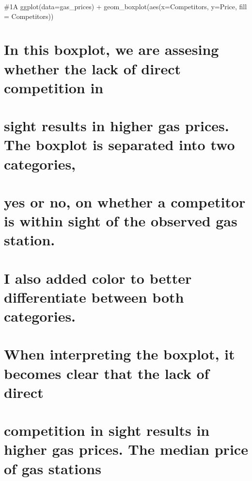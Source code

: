 \documentclass[
]{article}
\begin{document}
\#1A ggplot(data=gas\_prices) + geom\_boxplot(aes(x=Competitors,
y=Price, fill = Competitors))

\hypertarget{in-this-boxplot-we-are-assesing-whether-the-lack-of-direct-competition-in}{%
\section{In this boxplot, we are assesing whether the lack of direct
competition
in}\label{in-this-boxplot-we-are-assesing-whether-the-lack-of-direct-competition-in}}

\hypertarget{sight-results-in-higher-gas-prices.-the-boxplot-is-separated-into-two-categories}{%
\section{sight results in higher gas prices. The boxplot is separated
into two
categories,}\label{sight-results-in-higher-gas-prices.-the-boxplot-is-separated-into-two-categories}}

\hypertarget{yes-or-no-on-whether-a-competitor-is-within-sight-of-the-observed-gas-station.}{%
\section{yes or no, on whether a competitor is within sight of the
observed gas
station.}\label{yes-or-no-on-whether-a-competitor-is-within-sight-of-the-observed-gas-station.}}

\hypertarget{i-also-added-color-to-better-differentiate-between-both-categories.}{%
\section{I also added color to better differentiate between both
categories.}\label{i-also-added-color-to-better-differentiate-between-both-categories.}}

\hypertarget{when-interpreting-the-boxplot-it-becomes-clear-that-the-lack-of-direct}{%
\section{When interpreting the boxplot, it becomes clear that the lack
of
direct}\label{when-interpreting-the-boxplot-it-becomes-clear-that-the-lack-of-direct}}

\hypertarget{competition-in-sight-results-in-higher-gas-prices.-the-median-price-of-gas-stations}{%
\section{competition in sight results in higher gas prices. The median
price of gas
stations}\label{competition-in-sight-results-in-higher-gas-prices.-the-median-price-of-gas-stations}}
\end{document}

